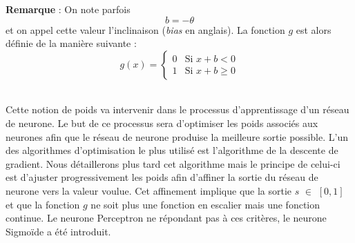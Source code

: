 \documentclass{article}
\begin{document}
	
	\textbf{Remarque} : On note parfois \[b = -\theta \]  et on appel cette valeur l'inclinaison (\textit{bias} en anglais). La fonction $g$ est alors définie de la manière suivante :   
		\[g(x) = \begin{cases} 0 &\mbox{Si } x + b < 0 \\
				 1 & \mbox{Si } x + b \geq 0
	 		 \end{cases} \] \\
\vfill
\begin{center}
\end{center}
\vfill
	 
Cette notion de poids va intervenir dans le processus d'apprentissage d'un réseau de neurone. Le but de ce processus sera d'optimiser les poids associés aux neurones afin que le réseau de neurone produise la meilleure sortie possible. L'un des algorithmes d'optimisation le plus utilisé est l'algorithme de la descente de gradient. Nous détaillerons plus tard cet algorithme mais le principe de celui-ci est d'ajuster progressivement les poids afin d'affiner la sortie du réseau de neurone vers la valeur voulue. Cet affinement implique que la sortie $s$ $\in$ $\left[0,1\right]$ et que la fonction $g$ ne soit plus une fonction en escalier mais une fonction continue. Le neurone Perceptron ne répondant pas à ces critères, le neurone Sigmoïde a été introduit. \\
\end{document}
